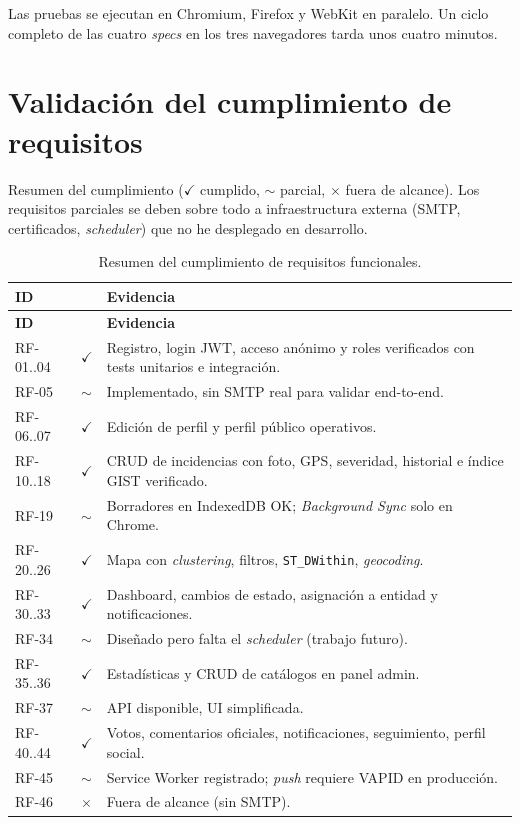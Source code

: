 Las pruebas se ejecutan en Chromium, Firefox y WebKit en paralelo. Un ciclo completo de las cuatro \textit{specs} en los tres navegadores tarda unos cuatro minutos.


\section{Validación del cumplimiento de requisitos}
\label{sec:validacion-requisitos}

\providecommand{\cmark}{\ensuremath{\checkmark}}
\providecommand{\pmark}{$\sim$}
\providecommand{\xmark}{$\times$}

Resumen del cumplimiento (\cmark{} cumplido, \pmark{} parcial, \xmark{} fuera de alcance). Los requisitos parciales se deben sobre todo a infraestructura externa (SMTP, certificados, \textit{scheduler}) que no he desplegado en desarrollo.

\begin{longtable}{@{}L{1.5cm}L{1cm}L{10cm}@{}}
\caption{Resumen del cumplimiento de requisitos funcionales.} \label{tab:validacion-rf} \\
\toprule
\textbf{ID} & \textbf{} & \textbf{Evidencia} \\
\midrule
\endfirsthead
\toprule
\textbf{ID} & \textbf{} & \textbf{Evidencia} \\
\midrule
\endhead
\bottomrule
\endfoot
RF-01..04 & \cmark & Registro, login JWT, acceso anónimo y roles verificados con tests unitarios e integración. \\
RF-05     & \pmark & Implementado, sin SMTP real para validar end-to-end. \\
RF-06..07 & \cmark & Edición de perfil y perfil público operativos. \\
RF-10..18 & \cmark & CRUD de incidencias con foto, GPS, severidad, historial e índice GIST verificado. \\
RF-19     & \pmark & Borradores en IndexedDB OK; \textit{Background Sync} solo en Chrome. \\
RF-20..26 & \cmark & Mapa con \textit{clustering}, filtros, \texttt{ST\_DWithin}, \textit{geocoding}. \\
RF-30..33 & \cmark & Dashboard, cambios de estado, asignación a entidad y notificaciones. \\
RF-34     & \pmark & Diseñado pero falta el \textit{scheduler} (trabajo futuro). \\
RF-35..36 & \cmark & Estadísticas y CRUD de catálogos en panel admin. \\
RF-37     & \pmark & API disponible, UI simplificada. \\
RF-40..44 & \cmark & Votos, comentarios oficiales, notificaciones, seguimiento, perfil social. \\
RF-45     & \pmark & Service Worker registrado; \textit{push} requiere VAPID en producción. \\
RF-46     & \xmark & Fuera de alcance (sin SMTP). \\
\end{longtable}

